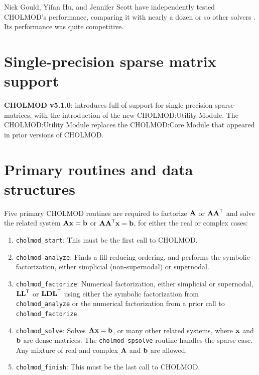 \documentclass[11pt]{article}
\newcommand{\m}[1]{{\bf{#1}}}       %
\newcommand{\tr}{^{\sf T}}          %
\begin{document}
Nick Gould, Yifan Hu, and Jennifer Scott have independently tested CHOLMOD's
performance, comparing it with nearly a dozen or so other solvers
\cite{GouldHuScott05,GouldHuScott05b}.  Its performance was quite competitive.

\section{Single-precision sparse matrix support}

{\bf CHOLMOD v5.1.0}: introduces full of support for single precision sparse
matrices, with the introduction of the new CHOLMOD:Utility Module.  The
CHOLMOD:Utility Module replaces the CHOLMOD:Core Module that appeared in prior
versions of CHOLMOD.

\newpage \section{Primary routines and data structures}

Five primary CHOLMOD routines are required to factorize $\m{A}$ or $\m{AA}\tr$
and solve the related system $\m{Ax}=\m{b}$ or $\m{AA}\tr\m{x}=\m{b}$,
for either the real or complex cases:
\begin{enumerate}
\item {\tt cholmod\_start}:
    This must be the first call to CHOLMOD.

\item {\tt cholmod\_analyze}:
    Finds a fill-reducing ordering, and performs the symbolic factorization,
    either simplicial (non-supernodal) or supernodal.

\item {\tt cholmod\_factorize}:
    Numerical factorization, either simplicial or supernodal, $\m{LL}\tr$ or
    $\m{LDL}\tr$ using either the symbolic factorization from {\tt
    cholmod\_analyze} or the numerical factorization from a prior call to {\tt
    cholmod\_factorize}.

\item {\tt cholmod\_solve}:
    Solves $\m{Ax}=\m{b}$, or many other related systems, where $\m{x}$ and
    $\m{b}$ are dense matrices.  The {\tt cholmod\_spsolve} routine handles
    the sparse case.  Any mixture of real and complex $\m{A}$ and $\m{b}$ are
    allowed.

\item {\tt cholmod\_finish}:
    This must be the last call to CHOLMOD.
\end{enumerate}
\end{document}
